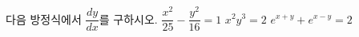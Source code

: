 다음 방정식에서 $\dfrac{dy}{dx}$를 구하시오.
 $\dfrac{x^2}{25}-\dfrac{y^2}{16}=1$
 $x^2y^3=2$
 $e^{x+y}+e^{x-y}=2$
